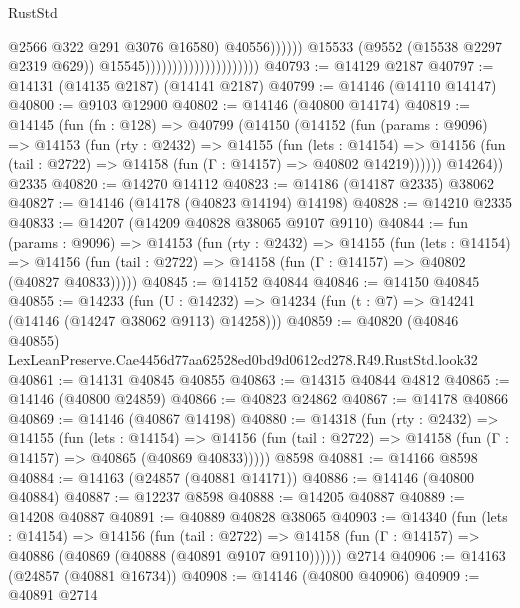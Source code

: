 \begin{lexlean}{RustStd}
\begin{coremodule}
                                                            @2566
                                                            @322
                                                            @291
                                                            @3076
                                                            @16580)
                                                          @40556))))))
                                              @15533
                                              (@9552 (@15538 @2297 @2319 @629))
                                              @15545)))))))))))))))))))))
@40793 := @14129 @2187
@40797 := @14131 (@14135 @2187) (@14141 @2187)
@40799 := @14146 (@14110 @14147)
@40800 := @9103 @12900
@40802 := @14146 (@40800 @14174)
@40819 := @14145
    (fun (fn : @128) =>
    @40799
      (@14150
        (@14152
          (fun (params : @9096) =>
          @14153
            (fun (rty : @2432) =>
            @14155
              (fun (lets : @14154) =>
              @14156 (fun (tail : @2722) => @14158 (fun (Γ : @14157) => @40802 @14219))))))
        @14264))
    @2335
@40820 := @14270 @14112
@40823 := @14186 (@14187 @2335) @38062
@40827 := @14146 (@14178 (@40823 @14194) @14198)
@40828 := @14210 @2335
@40833 := @14207 (@14209 @40828 @38065 @9107 @9110)
@40844 := fun (params : @9096) =>
  @14153
    (fun (rty : @2432) =>
    @14155
      (fun (lets : @14154) =>
      @14156 (fun (tail : @2722) => @14158 (fun (Γ : @14157) => @40802 (@40827 @40833)))))
@40845 := @14152 @40844
@40846 := @14150 @40845
@40855 := @14233
    (fun (U : @14232) => @14234 (fun (t : @7) => @14241 (@14146 (@14247 @38062 @9113) @14258)))
@40859 := @40820
    (@40846 @40855)
    LexLeanPreserve.Cae4456d77aa62528ed0bd9d0612cd278.R49.RustStd.look32
@40861 := @14131 @40845 @40855
@40863 := @14315 @40844 @4812
@40865 := @14146 (@40800 @24859)
@40866 := @40823 @24862
@40867 := @14178 @40866
@40869 := @14146 (@40867 @14198)
@40880 := @14318
    (fun (rty : @2432) =>
    @14155
      (fun (lets : @14154) =>
      @14156 (fun (tail : @2722) => @14158 (fun (Γ : @14157) => @40865 (@40869 @40833)))))
    @8598
@40881 := @14166 @8598
@40884 := @14163 (@24857 (@40881 @14171))
@40886 := @14146 (@40800 @40884)
@40887 := @12237 @8598
@40888 := @14205 @40887
@40889 := @14208 @40887
@40891 := @40889 @40828 @38065
@40903 := @14340
    (fun (lets : @14154) =>
    @14156
      (fun (tail : @2722) =>
      @14158 (fun (Γ : @14157) => @40886 (@40869 (@40888 (@40891 @9107 @9110))))))
    @2714
@40906 := @14163 (@24857 (@40881 @16734))
@40908 := @14146 (@40800 @40906)
@40909 := @40891 @2714

\end{coremodule}
\end{lexlean}
